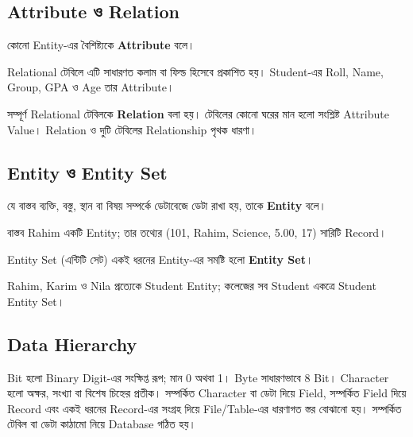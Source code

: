 \begin{flushleft}
\end{flushleft}

\subsection{Attribute ও Relation}
\begin{definitionbox}{}
কোনো Entity-এর বৈশিষ্ট্যকে \textbf{Attribute} বলে।
\end{definitionbox}
Relational টেবিলে এটি সাধারণত কলাম বা ফিল্ড হিসেবে প্রকাশিত হয়। Student-এর Roll, Name, Group, GPA ও Age তার Attribute।

সম্পূর্ণ Relational টেবিলকে \textbf{Relation} বলা হয়। টেবিলের কোনো ঘরের মান হলো সংশ্লিষ্ট Attribute Value। Relation ও দুটি টেবিলের Relationship পৃথক ধারণা।

\subsection{Entity ও Entity Set}
\begin{definitionbox}{}
যে বাস্তব ব্যক্তি, বস্তু, স্থান বা বিষয় সম্পর্কে ডেটাবেজে ডেটা রাখা হয়, তাকে \textbf{Entity} বলে।
\end{definitionbox}
বাস্তব Rahim একটি Entity; তার তথ্যের (101, Rahim, Science, 5.00, 17) সারিটি Record।

\begin{definitionbox}{Entity Set (এন্টিটি সেট)}
একই ধরনের Entity-এর সমষ্টি হলো \textbf{Entity Set}।
\end{definitionbox}
Rahim, Karim ও Nila প্রত্যেকে Student Entity; কলেজের সব Student একত্রে Student Entity Set।

\subsection{Data Hierarchy}
Bit হলো Binary Digit-এর সংক্ষিপ্ত রূপ; মান 0 অথবা 1। Byte সাধারণভাবে 8 Bit। Character হলো অক্ষর, সংখ্যা বা বিশেষ চিহ্নের প্রতীক। সম্পর্কিত Character বা ডেটা দিয়ে Field, সম্পর্কিত Field দিয়ে Record এবং একই ধরনের Record-এর সংগ্রহ দিয়ে File/Table-এর ধারণাগত স্তর বোঝানো হয়। সম্পর্কিত টেবিল বা ডেটা কাঠামো নিয়ে Database গঠিত হয়।

